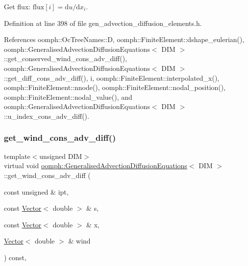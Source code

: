 Get flux\+: $\mbox{flux}[i] = \mbox{d}u / \mbox{d}x_i $. 



Definition at line 398 of file gen\+\_\+advection\+\_\+diffusion\+\_\+elements.\+h.



References oomph\+::\+Oc\+Tree\+Names\+::D, oomph\+::\+Finite\+Element\+::dshape\+\_\+eulerian(), oomph\+::\+Generalised\+Advection\+Diffusion\+Equations$<$ D\+I\+M $>$\+::get\+\_\+conserved\+\_\+wind\+\_\+cons\+\_\+adv\+\_\+diff(), oomph\+::\+Generalised\+Advection\+Diffusion\+Equations$<$ D\+I\+M $>$\+::get\+\_\+diff\+\_\+cons\+\_\+adv\+\_\+diff(), i, oomph\+::\+Finite\+Element\+::interpolated\+\_\+x(), oomph\+::\+Finite\+Element\+::nnode(), oomph\+::\+Finite\+Element\+::nodal\+\_\+position(), oomph\+::\+Finite\+Element\+::nodal\+\_\+value(), and oomph\+::\+Generalised\+Advection\+Diffusion\+Equations$<$ D\+I\+M $>$\+::u\+\_\+index\+\_\+cons\+\_\+adv\+\_\+diff().

\mbox{\label{classoomph_1_1GeneralisedAdvectionDiffusionEquations_a1be1bf36e263379cf99eb1ee703d4337}} 
\subsubsection{\texorpdfstring{get\+\_\+wind\+\_\+cons\+\_\+adv\+\_\+diff()}{get\_wind\_cons\_adv\_diff()}}
{\footnotesize\ttfamily template$<$unsigned D\+IM$>$ \\
virtual void \hyperlink{classoomph_1_1GeneralisedAdvectionDiffusionEquations}{oomph\+::\+Generalised\+Advection\+Diffusion\+Equations}$<$ D\+IM $>$\+::get\+\_\+wind\+\_\+cons\+\_\+adv\+\_\+diff (\begin{DoxyParamCaption}\item[{const unsigned \&}]{ipt,  }\item[{const \hyperlink{classoomph_1_1Vector}{Vector}$<$ double $>$ \&}]{s,  }\item[{const \hyperlink{classoomph_1_1Vector}{Vector}$<$ double $>$ \&}]{x,  }\item[{\hyperlink{classoomph_1_1Vector}{Vector}$<$ double $>$ \&}]{wind }\end{DoxyParamCaption}) const\hspace{0.3cm}{\ttfamily [inline]}, {\ttfamily [virtual]}}



